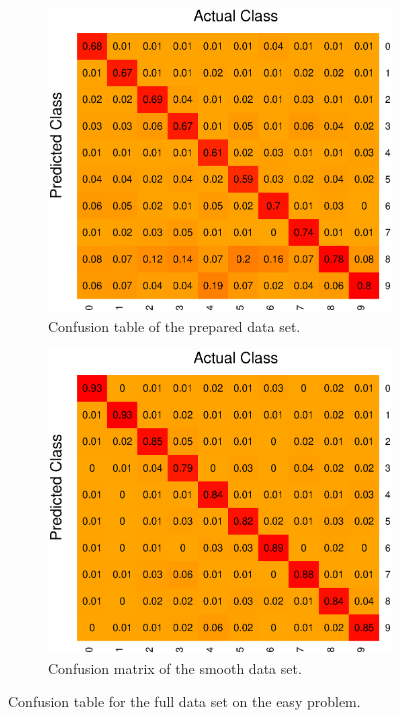 \begin{figure}[H]
\centering
\begin{subfigure}{0.49\textwidth}
\includegraphics[width=\textwidth]{graphics/tree_confusion_mix}
\caption{Confusion table of the prepared data set.}
\label{fig:tree_confus_mixed}
\end{subfigure}
\begin{subfigure}{0.49\textwidth}
\includegraphics[width=\textwidth]{graphics/tree_confusion_mix2}
\caption{Confusion matrix of the smooth data set.}
\label{fig:tree_confus_mixed_smooth}
\end{subfigure}
\caption[Confusion table for decision tree on the easy problem.]{Confusion table for the full data set on the easy problem.}
\end{figure}

